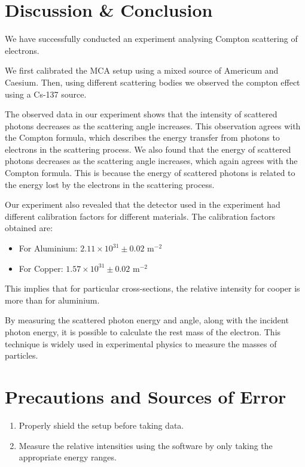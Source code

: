 \section{Discussion \& Conclusion}

We have successfully conducted an experiment analysing Compton scattering of electrons.

We first calibrated the MCA setup using a mixed source of Americum and Caesium. Then, using different scattering bodies we observed the compton effect using a Cs-137 source.

The observed data in our experiment shows that the intensity of scattered photons decreases as the scattering angle increases. This observation agrees with the Compton formula, which describes the energy transfer from photons to electrons in the scattering process.
We also found that the energy of scattered photons decreases as the scattering angle increases, which again agrees with the Compton formula. This is because the energy of scattered photons is related to the energy lost by the electrons in the scattering process.

Our experiment also revealed that the detector used in the experiment had different calibration factors for different materials. The calibration factors obtained are:\\

\begin{itemize}
    \item For Aluminium: $2.11\times 10^{31} \pm 0.02$ m$^{-2}$
    \item For Copper: $1.57 \times 10^{31} \pm 0.02$ m$^{-2}$\\
\end{itemize}

This implies that for particular cross-sections, the relative intensity for cooper is more than for aluminium.

By measuring the scattered photon energy and angle, along with the incident photon energy, it is possible to calculate the rest mass of the electron. This technique is widely used in experimental physics to measure the masses of particles.

\section{Precautions and Sources of Error}

\begin{enumerate}
    \item Properly shield the setup before taking data.
    \item Measure the relative intensities using the software by only taking the appropriate energy ranges.
\end{enumerate}